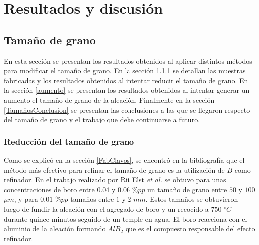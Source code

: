 \documentclass[a4paper,12pt,fleqn,twoside,openany]{book}
\begin{document}
% 



\chapter{Resultados y discusión}
\label{sec:resultados}


\section{Tamaño de grano}

En esta sección se presentan los resultados obtenidos al aplicar distintos métodos para modificar el tamaño de grano. En la sección \ref{reduccion} se detallan las muestras fabricadas y los resultados obtenidos al intentar reducir el tamaño de grano. En la sección \ref{aumento} se presentan los resultados obtenidos al intentar generar un aumento el tamaño de grano de la aleación. Finalmente en la sección \ref{TamañosConclusion} se presentan las conclusiones a las que se llegaron respecto del tamaño de grano y el trabajo que debe continuarse a futuro. 



\subsection{Reducción del tamaño de grano} \label{reduccion}

Como se explicó en la sección \ref{FabClavos}, se encontró en la bibliografía que el método más efectivo para refinar el tamaño de grano es la utilización de $B$ como refinador. En el trabajo realizado por Rit Elst \textit{et al.} \cite{ritelst} se obtuvo para unas concentraciones de boro entre $0.04$ y $0.06$ $\% pp$ un tamaño de grano entre $50$ y $100$ $\mu m$, y para $0.01$ $\%pp$ tamaños entre $1$ y $2$ $mm$. Estos tamaños se obtuvieron luego de fundir la aleación con el agregado de boro y un recocido a $750$ $^\circ C$ durante quince minutos seguido de un temple en agua. El boro reacciona con el aluminio de la aleación formando $AlB_2$ que es el compuesto responsable del efecto refinador. 
\end{document}
